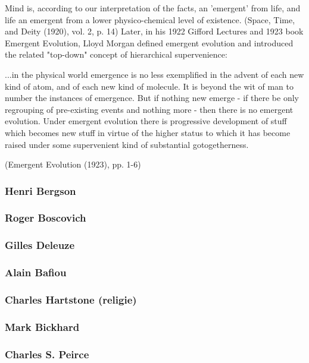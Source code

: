 \documentclass[a4paper]{Thesis}
\begin{document}
	Mind is, according to our interpretation of the facts, an 'emergent' from life, and life an emergent from a lower physico-chemical level of existence.
	(Space, Time, and Deity (1920), vol. 2, p. 14)
	Later, in his 1922 Gifford Lectures and 1923 book Emergent Evolution, Lloyd Morgan defined emergent evolution and introduced the related "top-down" concept of hierarchical supervenience:
	
	...in the physical world emergence is no less exemplified in the advent of each new kind of atom, and of each new kind of molecule. It is beyond the wit of man to number the instances of emergence. But if nothing new emerge - if there be only regrouping of pre-existing events and nothing more - then there is no emergent evolution.
	Under emergent evolution there is progressive development of stuff which becomes new stuff in virtue of the higher status to which it has become raised under some supervenient kind of substantial gotogetherness.
	
	(Emergent Evolution (1923), pp. 1-6)
	
	\subsubsection{Henri Bergson}
	\subsubsection{Roger Boscovich}
	\subsubsection{Gilles Deleuze}
	\subsubsection{Alain Bafiou}
	\subsubsection{Charles Hartstone (religie)}
	\subsubsection{Mark Bickhard}
	\subsubsection{Charles S. Peirce}
\end{document}
